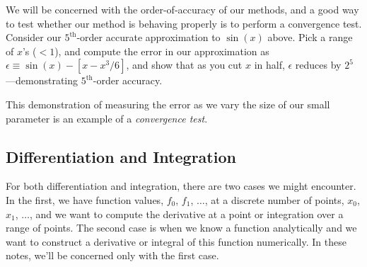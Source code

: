 \begin{exercise}
We will be concerned with the order-of-accuracy of our methods, and a
good way to test whether our method is behaving properly is to perform
a convergence test.  Consider our $5^\mathrm{th}$-order accurate
approximation to $\sin(x)$ above.  Pick a range of $x$'s ($< 1$), and
compute the error in our approximation as $\epsilon \equiv \sin(x) - [
  x - x^3/6 ]$, and show that as you cut $x$ in half, $\epsilon$
reduces by $2^5$---demonstrating $5^\mathrm{th}$-order accuracy.
\end{exercise}

This demonstration of measuring the error as we vary the size
of our small parameter is an example of a {\em convergence test}.

\subsection{Differentiation and Integration}

For both differentiation and integration, there are two cases we might
encounter.  In the first, we have function values, $f_0$, $f_1$,
$\ldots$, at a discrete number of points, $x_0$, $x_1$, $\ldots$, and
we want to compute the derivative at a point or integration over a
range of points.  The second case is when we know a function
analytically and we want to construct a derivative or integral of this
function numerically.  In these notes, we'll be concerned only with
the first case.

